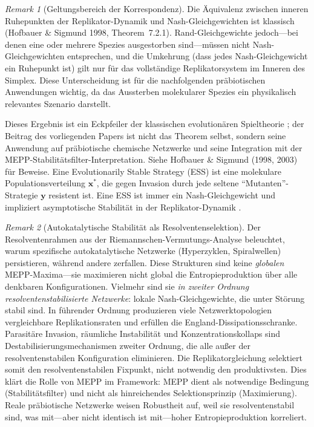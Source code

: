 \documentclass[12pt,a4paper]{article}
\theoremstyle{remark}
\newtheorem{remark}{Remark}
\begin{document}
\begin{remark}[Geltungsbereich der Korrespondenz]
Die \"Aquivalenz zwischen inneren Ruhepunkten der Replikator-Dynamik und Nash-Gleichgewichten ist klassisch (Hofbauer \& Sigmund 1998, Theorem~7.2.1). Rand-Gleichgewichte jedoch---bei denen eine oder mehrere Spezies ausgestorben sind---m\"ussen nicht Nash-Gleichgewichten entsprechen, und die Umkehrung (dass jedes Nash-Gleichgewicht ein Ruhepunkt ist) gilt nur f\"ur das vollst\"andige Replikatorsystem im Inneren des Simplex. Diese Unterscheidung ist f\"ur die nachfolgenden pr\"abiotischen Anwendungen wichtig, da das Aussterben molekularer Spezies ein physikalisch relevantes Szenario darstellt.
\end{remark}

Dieses Ergebnis ist ein Eckpfeiler der klassischen evolution\"aren Spieltheorie \citep{Weibull1995}; der Beitrag des vorliegenden Papers ist nicht das Theorem selbst, sondern seine Anwendung auf pr\"abiotische chemische Netzwerke und seine Integration mit der MEPP-Stabilit\"atsfilter-Interpretation. Siehe Hofbauer \& Sigmund (1998, 2003) f\"ur Beweise. Eine Evolutionarily Stable Strategy (ESS) ist eine molekulare Populationsverteilung $\mathbf{x}^*$, die gegen Invasion durch jede seltene ``Mutanten''-Strategie $\mathbf{y}$ resistent ist. Eine ESS ist immer ein Nash-Gleichgewicht und impliziert asymptotische Stabilit\"at in der Replikator-Dynamik \citep{HofbauerSigmund1998}.

\begin{remark}[Autokatalytische Stabilit\"at als Resolventenselektion]
\label{rem:autocatalysis-resolvent}
Der Resolventenrahmen aus der Riemannschen-Vermutungs-Analyse \citep{GeigerRH2026b} beleuchtet, warum spezifische autokatalytische Netzwerke (Hyperzyklen, Spiralwellen) persistieren, w\"ahrend andere zerfallen. Diese Strukturen sind keine \emph{globalen} MEPP-Maxima---sie maximieren nicht global die Entropieproduktion \"uber alle denkbaren Konfigurationen. Vielmehr sind sie \emph{in zweiter Ordnung resolventenstabilisierte Netzwerke}: lokale Nash-Gleichgewichte, die unter St\"orung stabil sind. In f\"uhrender Ordnung produzieren viele Netzwerktopologien vergleichbare Replikationsraten und erf\"ullen die England-Dissipationsschranke. Parasit\"are Invasion, r\"aumliche Instabilit\"at und Konzentrationskollaps sind Destabilisierungsmechanismen zweiter Ordnung, die alle au\ss{}er der resolventenstabilen Konfiguration eliminieren. Die Replikatorgleichung selektiert somit den resolventenstabilen Fixpunkt, nicht notwendig den produktivsten. Dies kl\"art die Rolle von MEPP im Framework: MEPP dient als notwendige Bedingung (Stabilit\"atsfilter) und nicht als hinreichendes Selektionsprinzip (Maximierung). Reale pr\"abiotische Netzwerke weisen Robustheit auf, weil sie resolventenstabil sind, was mit---aber nicht identisch ist mit---hoher Entropieproduktion korreliert.
\end{remark}
\end{document}
